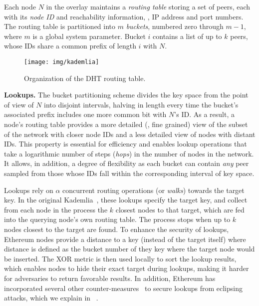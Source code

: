 Each node $N$ in the overlay maintains a \emph{routing table} storing a set of peers, each with its \emph{node ID} and reachability information, \ie, IP address and port numbers.
The routing table is partitioned into $m$ \textit{buckets}, numbered zero through $m-1$, where $m$ is a global system parameter.
Bucket $i$ contains a list of up to $k$ peers, whose IDs share a common prefix of length $i$ with $N$.


\begin{figure}
    \texttt{[image: img/kademlia]}
    \caption{Organization of the DHT routing table.}
    \label{fig:kademlia}
 \end{figure}

\smallskip
\noindent
\textbf{Lookups.}
%
The bucket partitioning scheme divides the key space from the point of view of $N$ into disjoint intervals, halving in length every time the bucket's associated prefix includes one more common bit with $N$'s ID.
As a result, a node's routing table provides a more detailed (\ie, fine grained) view of the subset of the network with closer node IDs and a less detailed view of nodes with distant IDs.
This property is essential for efficiency and enables lookup operations that take a logarithmic number of steps (\emph{hops}) in the number of nodes in the network.
It allows, in addition, a degree of flexibility as each bucket can contain \textit{any} peer sampled from those whose IDs fall within the corresponding interval of key space.

Lookups rely on $\alpha$ concurrent routing operations (or \emph{walks}) towards the target key.
In the original Kademlia~\cite{maymounkov2002kademlia}, these lookups specify the target key, and collect from each node in the process the $k$ closest nodes to that target, which are fed into the querying node's own routing table.
The process stops when up to $k$ nodes closest to the target are found. %
To enhance the security of lookups, Ethereum nodes provide a distance to a key (instead of the target itself) where distance is defined as the bucket number of they key where 
the target node would be inserted. The XOR metric is then used locally to sort the lookup results, which enables nodes to hide their exact target during lookups, making it harder for adversaries to return favorable results. 
In addition, Ethereum has incorporated several other counter-measures~\cite{marcus2018low, henningsen2019eclipsing} to secure lookups from eclipsing attacks, which we explain in ~. 


